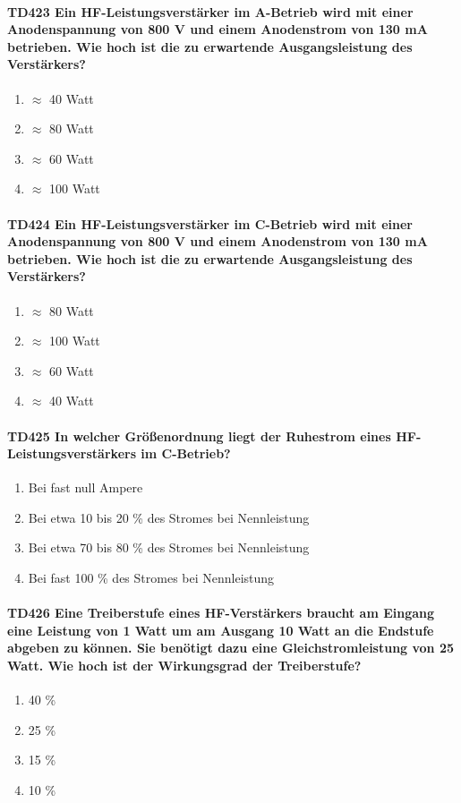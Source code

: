 \documentclass[8pt]{article}
\begin{document}
\begin{enumerate}
\begin{enumerate}[nolistsep,label=\Alph*]
\paragraph*{TD423 Ein HF-Leistungsverstärker im A-Betrieb wird mit einer Anodenspannung von 800 V und einem Anodenstrom von 130 mA betrieben. Wie hoch ist die zu erwartende Ausgangsleistung des Verstärkers?}
\begin{enumerate}[nolistsep,label=\Alph*]
\item $\approx$ 40 Watt
\item $\approx$ 80 Watt
\item $\approx$ 60 Watt
\item $\approx$ 100 Watt
\end{enumerate}

\paragraph*{TD424 Ein HF-Leistungsverstärker im C-Betrieb wird mit einer Anodenspannung von 800 V und einem Anodenstrom von 130 mA betrieben. Wie hoch ist die zu erwartende Ausgangsleistung des Verstärkers?}
\begin{enumerate}[nolistsep,label=\Alph*]
\item $\approx$ 80 Watt
\item $\approx$ 100 Watt
\item $\approx$ 60 Watt
\item $\approx$ 40 Watt
\end{enumerate}

\paragraph*{TD425 In welcher Größenordnung liegt der Ruhestrom eines HF-Leistungsverstärkers im C-Betrieb?}
\begin{enumerate}[nolistsep,label=\Alph*]
\item Bei fast null Ampere
\item Bei etwa 10 bis 20 \% des Stromes bei Nennleistung
\item Bei etwa 70 bis 80 \% des Stromes bei Nennleistung
\item Bei fast 100 \% des Stromes bei Nennleistung
\end{enumerate}

\paragraph*{TD426 Eine Treiberstufe eines HF-Verstärkers braucht am Eingang eine Leistung von 1 Watt um am Ausgang 10 Watt an die Endstufe abgeben zu können. Sie benötigt dazu eine Gleichstromleistung von 25 Watt. Wie hoch ist der Wirkungsgrad der Treiberstufe?}
\begin{enumerate}[nolistsep,label=\Alph*]
\item 40 \%
\item 25 \%
\item 15 \%
\item 10 \%
\end{enumerate}


\end{enumerate}
\end{enumerate}
\end{document}
